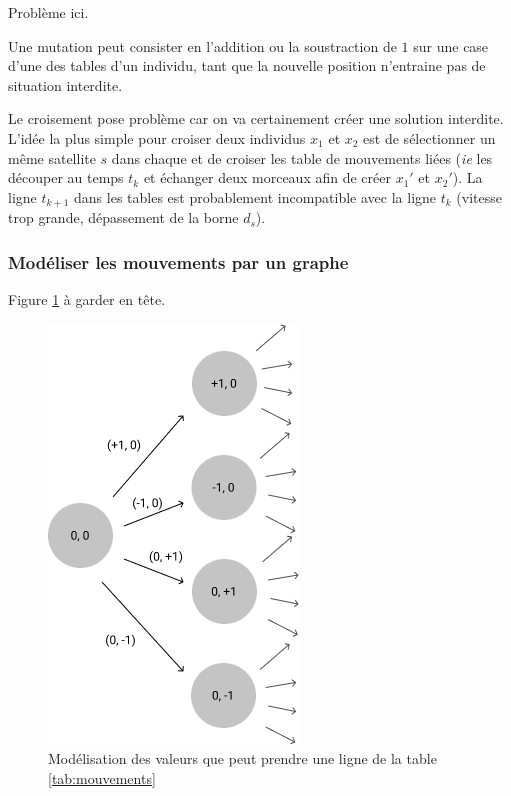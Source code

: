 \documentclass[11pt, oneside]{article}   	%
\begin{document}
Problème ici.

Une mutation peut consister en l'addition ou la soustraction de $1$ sur une case
d'une des tables d'un individu, tant que la nouvelle position n'entraine pas de
situation interdite.

Le croisement pose problème car on va certainement créer une solution
interdite.
L'idée la plus simple pour croiser deux individus $x_1$ et $x_2$ est
de sélectionner un m\^eme satellite $s$ dans chaque et de croiser les table
de mouvements liées (\emph{ie} les découper au temps $t_k$ et échanger deux
morceaux afin de créer $x_1'$ et $x_2'$). La ligne $t_{k+1}$ dans les tables
est probablement incompatible avec la ligne $t_k$ (vitesse trop grande,
dépassement de la borne $d_s$).

\subsubsection{Modéliser les mouvements par un graphe}

Figure \ref{fig:graph} à garder en t\^ete.

\begin{figure}[htb]
    \begin{center}
        \includegraphics[scale=0.5]{graph.png}
        \caption{\label{fig:graph}Modélisation des valeurs que peut prendre une
        ligne de la table \ref{tab:mouvements}}
    \end{center}
\end{figure}
\end{document}

